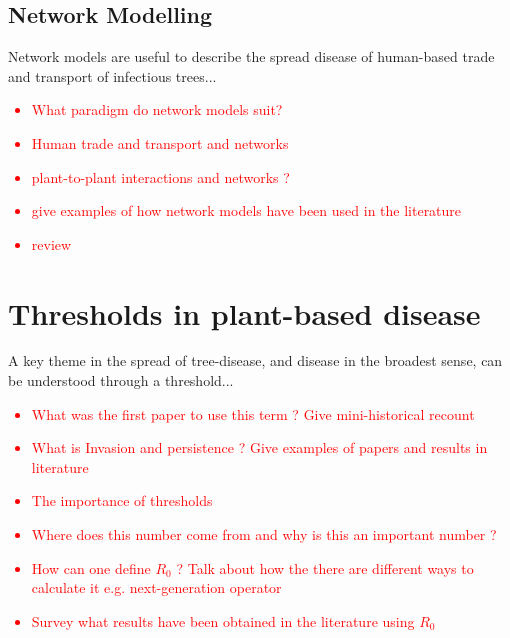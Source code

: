 \subsection{Network Modelling}

Network models are useful to describe the spread disease of human-based trade and transport of infectious trees...

\textcolor{red}{
\begin{itemize}
    \item What paradigm do network models suit?
    \item Human trade and transport and networks 
    \item plant-to-plant interactions and networks ? 
    \item give examples of how network models have been used in the literature
    \item review \cite{doi:10.1098/rsif.2005.0051}
\end{itemize}}

\section{Thresholds in plant-based disease}

A key theme in the spread of tree-disease, and disease in the broadest sense, can be understood through a threshold...

\textcolor{red}{
\begin{itemize}
    \item What was the first paper to use this term ? Give mini-historical recount
    \item What is Invasion and persistence ? Give examples of papers and results in literature 
    \item The importance of thresholds
    \item Where does this number come from and why is \textbf{}this an important number ?
    \item How can one define $R_0$ ? Talk about how the there are different ways to calculate it e.g. next-generation operator 
    \item Survey what results have been obtained in the literature using $R_0$
\end{itemize}}

